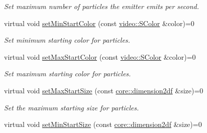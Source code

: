 \begin{DoxyCompactItemize}
\begin{DoxyCompactList}\small\item\em Set maximum number of particles the emitter emits per second. \end{DoxyCompactList}\item 
\mbox{\label{classirr_1_1scene_1_1IParticleEmitter_a4fcbde10bd7885b5a87f19b0a916b5ca}} 
virtual void \hyperlink{classirr_1_1scene_1_1IParticleEmitter_a4fcbde10bd7885b5a87f19b0a916b5ca}{set\+Min\+Start\+Color} (const \hyperlink{classirr_1_1video_1_1SColor}{video\+::\+S\+Color} \&color)=0
\begin{DoxyCompactList}\small\item\em Set minimum starting color for particles. \end{DoxyCompactList}\item 
\mbox{\label{classirr_1_1scene_1_1IParticleEmitter_a7fe40f02ec88e54ff9d5273495cdf879}} 
virtual void \hyperlink{classirr_1_1scene_1_1IParticleEmitter_a7fe40f02ec88e54ff9d5273495cdf879}{set\+Max\+Start\+Color} (const \hyperlink{classirr_1_1video_1_1SColor}{video\+::\+S\+Color} \&color)=0
\begin{DoxyCompactList}\small\item\em Set maximum starting color for particles. \end{DoxyCompactList}\item 
\mbox{\label{classirr_1_1scene_1_1IParticleEmitter_ab395cff6fc4910e437876aca1edc348c}} 
virtual void \hyperlink{classirr_1_1scene_1_1IParticleEmitter_ab395cff6fc4910e437876aca1edc348c}{set\+Max\+Start\+Size} (const \hyperlink{namespaceirr_1_1core_af6dc5c45ff13e7712758c827ff58676b}{core\+::dimension2df} \&size)=0
\begin{DoxyCompactList}\small\item\em Set the maximum starting size for particles. \end{DoxyCompactList}\item 
\mbox{\label{classirr_1_1scene_1_1IParticleEmitter_a05fdfbf05ef3b86304e55b1712c12725}} 
virtual void \hyperlink{classirr_1_1scene_1_1IParticleEmitter_a05fdfbf05ef3b86304e55b1712c12725}{set\+Min\+Start\+Size} (const \hyperlink{namespaceirr_1_1core_af6dc5c45ff13e7712758c827ff58676b}{core\+::dimension2df} \&size)=0

\end{DoxyCompactItemize}
